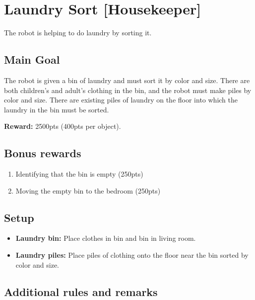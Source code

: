 \section{Laundry Sort [Housekeeper]}
The robot is helping to do laundry by sorting it.


\subsection{Main Goal}
The robot is given a bin of laundry and must sort it by color and size. There are both children's and adult's clothing in the bin, and the robot must make piles by color and size. There are existing piles of laundry on the floor into which the laundry in the bin must be sorted.

\noindent\textbf{Reward:} 2500pts (400pts per object).

\subsection{Bonus rewards}
\begin{enumerate}[nosep]
	\item Identifying that the bin is empty (250pts)
	\item Moving the empty bin to the bedroom (250pts)
\end{enumerate}


\subsection{Setup}
\begin{itemize}[nosep]
	\item \textbf{Laundry bin:} Place clothes in bin and bin in living room.

	\item \textbf{Laundry piles:} Place piles of clothing onto the floor near the bin sorted by color and size.
\end{itemize}

\subsection{Additional rules and remarks}

